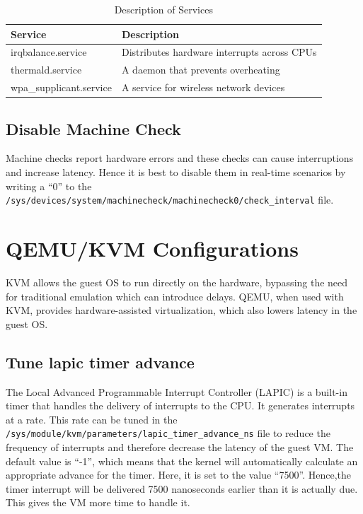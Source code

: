 \documentclass[MMR,Master,english]{twbook}
\begin{document}
\begin{table}[H]
	\centering
	\caption{Description of Services}
	\label{tab:stop_servies}
	\setlength{\tabcolsep}{0.5em} %
	{\renewcommand{\arraystretch}{1.2}%
	\begin{tabular}{|l|l|}
	\hline
	\textbf{Service} & \textbf{Description} \\
	\hline
	irqbalance.service & Distributes hardware interrupts across CPUs \\\hline
	thermald.service & A daemon that prevents overheating \\\hline
	wpa\_supplicant.service & A service for wireless network devices \\
	\hline
	\end{tabular}}
	\end{table}
\subsection{Disable Machine Check}
Machine checks report hardware errors and these checks can cause interruptions and increase latency. Hence it is best to disable them in real-time scenarios by writing a ``0'' to the \texttt{/sys/devices/system/machinecheck/machinecheck0/check\_interval} file.

\section{QEMU/KVM Configurations}\label{sec:guest_configurations}
KVM allows the guest OS to run directly on the hardware, bypassing the need for traditional emulation which can introduce delays. QEMU, when used with KVM, provides hardware-assisted virtualization, which also lowers latency in the guest OS.

\subsection{Tune lapic timer advance}
The Local Advanced Programmable Interrupt Controller (LAPIC) is a built-in timer that handles the delivery of interrupts to the CPU.
It generates interrupts at a rate. This rate can be tuned in the \texttt{/sys/module/kvm/parameters/lapic\_timer\_advance\_ns} file to reduce the frequency of interrupts and therefore decrease the latency of the guest VM. The default value is ``-1'', which means that the kernel will automatically calculate an appropriate advance for the timer. Here, it is set to the value ``7500''. Hence,the timer interrupt will be delivered 7500 nanoseconds earlier than it is actually due. This gives the VM more time to handle it.
\end{document}
